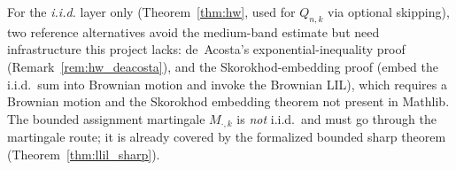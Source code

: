 For the \emph{i.i.d.} layer only (Theorem~\ref{thm:hw}, used for $Q_{n,k}$ via optional skipping),
two reference alternatives avoid the medium-band estimate but need infrastructure this project
lacks: de~Acosta's exponential-inequality proof \cite{deAcosta1983}
(Remark~\ref{rem:hw_deacosta}), and the Skorokhod-embedding proof
\cite{Steele2001} (embed the i.i.d.\ sum into Brownian motion and invoke the Brownian LIL), which
requires a Brownian motion and the Skorokhod embedding theorem not present in Mathlib. The
bounded assignment martingale $M_{\cdot,k}$ is \emph{not} i.i.d.\ and must go through the martingale
route; it is already covered by the formalized bounded sharp theorem
(Theorem~\ref{thm:llil_sharp}).
